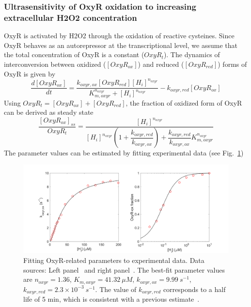 \documentclass[11pt]{article}
\begin{document}
\subsubsection{Ultrasensitivity of OxyR oxidation to increasing extracellular H2O2 concentration}

OxyR is activated by H2O2 through the oxidation of reactive cysteines. Since OxyR behaves as an autorepressor at the transcriptional level, we assume that the total concentration of OxyR is a constant ($OxyR_t$). The dynamics of interconversion between oxidized ($[OxyR_{ox}]$) and reduced ($[OxyR_{red}]$) forms of OxyR is given by
\begin{equation}
\frac{d[OxyR_{ox}]}{dt} = \frac{k_{oxyr,ox}[OxyR_{red}][H_i]^{n_{oxyr}}}{K_{m,oxyr}^{n_{oxyr}}+[H_i]^{n_{oxyr}}}-k_{oxyr,red}[OxyR_{ox}]
\end{equation}
Using $OxyR_t=[OxyR_{ox}]+[OxyR_{red}]$, the fraction of oxidized form of OxyR can be derived as steady state
\begin{equation}
\frac{[OxyR_{ox}]_{ss}}{OxyR_t} = \frac{[H_i]^{n_{oxyr}}}{[H_i]^{n_{oxyr}}\left(1+\dfrac{k_{oxyr,red}}{k_{oxyr,ox}}\right)+\dfrac{k_{oxyr,red}}{k_{oxyr,ox}}K_{m,oxyr}^{n_{oxyr}}}
\end{equation}
The parameter values can be estimated by fitting experimental data (see Fig.~\ref{fig:fit_oxyr_paras})
\begin{figure}[h!]
\centering
  \includegraphics[width=1\linewidth]{fit_oxyR_paras.png}
  \caption{Fitting OxyR-related parameters to experimental data. Data sources: Left panel~\cite{lee2004redox} and right panel~\cite{aaslund1999regulation}. The best-fit parameter values are $n_{oxyr} = 1.36$, $K_{m,oxyr}=41.32~\mu M$, $k_{oxyr,ox}=9.99~s^{-1}$, $k_{oxyr,red}=2.3\times 10^{-3}~s^{-1}$. The value of $k_{oxyr,red}$ corresponds to a half life of 5 min, which is consistent with a previous estimate~\cite{aaslund1999regulation}.}
  \label{fig:fit_oxyr_paras}
\end{figure}
\end{document}
